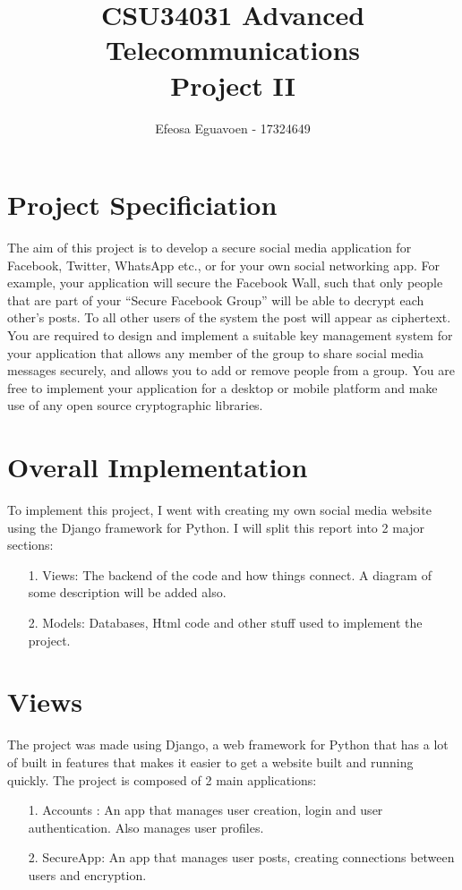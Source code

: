 \documentclass[11pt]{article} %
\title{CSU34031 Advanced Telecommunications \\ Project II}
\author{Efeosa Eguavoen - 17324649}
\begin{document}
\maketitle
\newpage
\section{Project Specificiation}
The aim of this project is to develop a secure social media application for Facebook, Twitter, WhatsApp etc., or for your own social networking app. For example, your application will secure the Facebook Wall, such that only people that are part of your “Secure Facebook Group” will be able to decrypt each other’s posts. To all other users of the system the post will appear as ciphertext. 
 You are required to design and implement a suitable key management system for your application that allows any member of the group to share social media messages securely, and allows you to add or remove people from a group. You are free to implement your application for a desktop or mobile platform and make use of any open source cryptographic libraries. 
 

\section{Overall Implementation}
To implement this project, I went with creating my own social media website using the Django framework for Python. I will split this report into 2 major sections:
\begin{itemize}
\item[1.] Views: The backend of the code and how things connect. A diagram of some description will be added also.
\item[2.] Models: Databases, Html code and other stuff used to implement the project.
\end{itemize}

\section{Views}
The project was made using Django, a web framework for Python that has a lot of built in features that makes it easier to get a website built and running quickly. The project is composed of 2 main applications: 
\begin{itemize}
\item[1.]Accounts : An app that manages user creation, login and user authentication. Also manages user profiles.
\item[2.]SecureApp: An app that manages user posts, creating connections between users and encryption.
\end{itemize}
\end{document}
